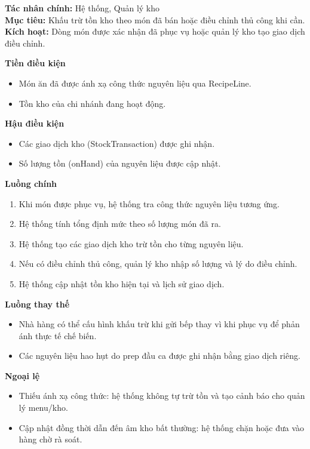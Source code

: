 \documentclass[11pt,a4paper]{article}
\begin{document}
    \begin{usecasebox}[title={UC-INV-01 --- Cập nhật tiêu hao tồn kho sau phục vụ}]
    \textbf{Tác nhân chính:} Hệ thống, Quản lý kho\\
    \textbf{Mục tiêu:} Khấu trừ tồn kho theo món đã bán hoặc điều chỉnh thủ công khi cần.\\
    \textbf{Kích hoạt:} Dòng món được xác nhận đã phục vụ hoặc quản lý kho tạo giao dịch điều chỉnh.

    \medskip
    \textbf{Tiền điều kiện}
    \begin{itemize}[leftmargin=1.8em]
  \item Món ăn đã được ánh xạ công thức nguyên liệu qua \textsf{RecipeLine}.
  \item Tồn kho của chi nhánh đang hoạt động.
\end{itemize}

    \textbf{Hậu điều kiện}
    \begin{itemize}[leftmargin=1.8em]
  \item Các giao dịch kho (\textsf{StockTransaction}) được ghi nhận.
  \item Số lượng tồn (\textsf{onHand}) của nguyên liệu được cập nhật.
\end{itemize}

    \textbf{Luồng chính}
    \begin{enumerate}[leftmargin=1.8em]
  \item Khi món được phục vụ, hệ thống tra công thức nguyên liệu tương ứng.
  \item Hệ thống tính tổng định mức theo số lượng món đã ra.
  \item Hệ thống tạo các giao dịch kho trừ tồn cho từng nguyên liệu.
  \item Nếu có điều chỉnh thủ công, quản lý kho nhập số lượng và lý do điều chỉnh.
  \item Hệ thống cập nhật tồn kho hiện tại và lịch sử giao dịch.
\end{enumerate}

    \textbf{Luồng thay thế}
    \begin{itemize}[leftmargin=1.8em]
  \item Nhà hàng có thể cấu hình khấu trừ khi gửi bếp thay vì khi phục vụ để phản ánh thực tế chế biến.
  \item Các nguyên liệu hao hụt do prep đầu ca được ghi nhận bằng giao dịch riêng.
\end{itemize}

    \textbf{Ngoại lệ}
    \begin{itemize}[leftmargin=1.8em]
  \item Thiếu ánh xạ công thức: hệ thống không tự trừ tồn và tạo cảnh báo cho quản lý menu/kho.
  \item Cập nhật đồng thời dẫn đến âm kho bất thường: hệ thống chặn hoặc đưa vào hàng chờ rà soát.
\end{itemize}


\end{usecasebox}
\end{document}
